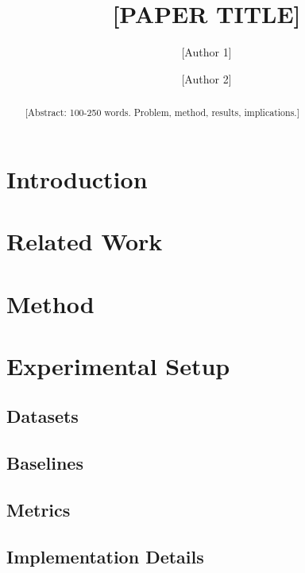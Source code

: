 \documentclass[11pt,a4paper]{article}
\title{[PAPER TITLE]}
\author{[Author 1] \and [Author 2]}
\begin{document}
\maketitle

\begin{abstract}
[Abstract: 100-250 words. Problem, method, results, implications.]
\end{abstract}

\section{Introduction}

\section{Related Work}

\section{Method}

\section{Experimental Setup}

\subsection{Datasets}

\subsection{Baselines}

\subsection{Metrics}

\subsection{Implementation Details}
\end{document}
